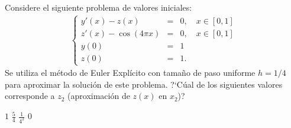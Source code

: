 \begin{pregunta}
\begin{cuerpo}
Considere el siguiente problema de valores iniciales:
\begin{eqnarray*}
\left \{
\begin{array}{lcl}
y'(x)- z(x)&=&0, \quad  x \in [0,1]\\
z'(x)- \cos(4\pi x) &=& 0, \quad  x \in [0,1]\\
y(0)&=&1\\
z(0)&=&1.
\end{array}
\right.
\end{eqnarray*}
Se utiliza el m\'etodo de Euler Expl\'icito con tama\~no de paso uniforme $h=1/4$ para aproximar la soluci\'on de este problema. ?`C\'ual de los siguientes valores corresponde a $z_2$ (aproximaci\'on de $z(x)$ en $x_2$)? 
\end{cuerpo}
\begin{multicols}{4}
\begin{alternativas}
{$1$} %
{$\frac{5}{4}$} 
{$\frac{1}{4^2}$} 
{$0$}
\end{alternativas}
\end{multicols}
\justificacion{9cm}
\end{pregunta}